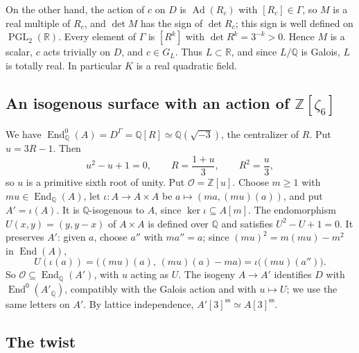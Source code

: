 \documentclass[11pt]{article}
\newcommand{\Q}{\mathbb Q}
\newcommand{\Z}{\mathbb Z}
\DeclareMathOperator{\End}{End}
\DeclareMathOperator{\PGL}{PGL}
\DeclareMathOperator{\Ad}{Ad}
\begin{document}
On the other hand, the action of \(c\) on \(D\) is \(\Ad(R_c)\) with
\([R_c]\in\Gamma\), so \(M\) is a real multiple of \(R_c\), and
\(\det M\) has the sign of \(\det R_c\); this sign is well defined on
\(\PGL_2(\mathbb R)\). Every element of \(\Gamma\) is \([R^k]\) with
\(\det R^k=3^{-k}>0\). Hence \(M\) is a scalar, \(c\) acts trivially on
\(D\), and \(c\in G_L\). Thus \(L\subset\mathbb R\), and since \(L/\Q\)
is Galois, \(L\) is totally real. In particular \(K\) is a real
quadratic field.

\subsection{An isogenous surface with an action of \texorpdfstring{\(\Z[\zeta_6]\)}{Z[zeta6]}}\label{sec:normalization}

We have \(\End^0_{\Q}(A)=D^\Gamma=\Q[R]\simeq\Q(\sqrt{-3})\), the
centralizer of \(R\). Put \(u=3R-1\). Then
\[
 u^2-u+1=0,\qquad R=\frac{1+u}3,\qquad R^2=\frac u3,
\]
so \(u\) is a primitive sixth root of unity. Put \(\mathcal O=\Z[u]\).
Choose \(m\geq1\) with \(mu\in\End_{\Q}(A)\), let
\(\iota:A\to A\times A\) be \(a\mapsto(ma,(mu)(a))\), and put
\(A'=\iota(A)\). It is \(\Q\)-isogenous to \(A\), since
\(\ker\iota\subseteq A[m]\). The endomorphism \(U(x,y)=(y,y-x)\) of
\(A\times A\) is defined over \(\Q\) and satisfies \(U^2-U+1=0\). It
preserves \(A'\): given \(a\), choose \(a''\) with \(ma''=a\); since
\((mu)^2=m(mu)-m^2\) in \(\End(A)\),
\[
 U(\iota(a))=\bigl((mu)(a),\,(mu)(a)-ma\bigr)=\iota\bigl((mu)(a'')\bigr).
\]
So \(\mathcal O\subseteq\End_{\Q}(A')\), with \(u\) acting as \(U\). The
isogeny \(A\to A'\) identifies \(D\) with \(\End^0(A'_{\overline{\Q}})\),
compatibly with the Galois action and with \(u\mapsto U\); we use the
same letters on \(A'\). By lattice independence,
\(A'[3]^{\mathrm{ss}}\simeq A[3]^{\mathrm{ss}}\).

\subsection{The twist}\label{sec:twist}
\end{document}
